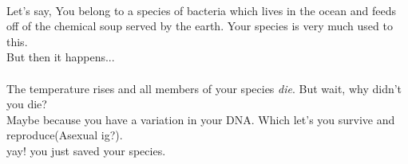 \documentclass[A4]{article}
\begin{document}
    \paragraph{}
    Let's say,
    You belong to a species of bacteria which lives in the ocean and feeds off of the chemical soup served by the earth.
    Your species is very much used to this. \\ 
    But then it happens... \\
     \\
    The temperature rises and all members of your species \emph{die}. But wait, why didn't you die? \\
    Maybe because you have a variation in your DNA. Which let's you survive and reproduce(Asexual ig?). \\
    yay! you just saved your species.\\
\end{document}
